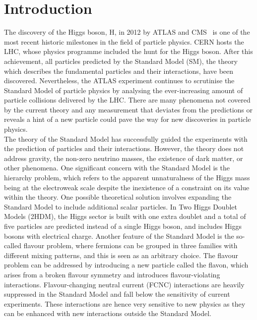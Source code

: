 \setchapterpreamble[u]{\margintoc}
\chapter*{Introduction}

The discovery of the Higgs boson, H, in 2012 by ATLAS and CMS~\cite{ATLASHiggs2012,CMShiggs2012} is one of the most recent historic milestones in the field of particle physics. CERN hosts the LHC, whose physics programme included the hunt for the Higgs boson. After this achievement, all particles predicted by the Standard Model (SM), the theory which describes the fundamental particles and their interactions, have been discovered. Nevertheless, the ATLAS experiment continues to scrutinise the Standard Model of particle physics by analysing the ever-increasing amount of particle collisions delivered by the LHC. There are many phenomena not covered by the current theory and any measurement that deviates from the predictions or reveals a hint of a new particle could pave the way for new discoveries in particle physics.\\

The theory of the Standard Model has successfully guided the experiments with the prediction of particles and their interactions. However, the theory does not address gravity, the non-zero neutrino masses, the existence of dark matter, or other phenomena. One significant concern with the Standard Model is the hierarchy problem, which refers to the apparent unnaturalness of the Higgs mass being at the electroweak scale despite the inexistence of a constraint on its value within the theory. One possible theoretical solution involves expanding the Standard Model to include additional scalar particles. In Two Higgs Doublet Models (2HDM), the Higgs sector is built with one extra doublet and a total of five particles are predicted instead of a single Higgs boson, and includes Higgs bosons with electrical charge.
Another feature of the Standard Model is the so-called flavour problem, where fermions can be grouped in three families with different mixing patterns, and this is seen as an arbitrary choice. The flavour problem can be addressed by introducing a new particle called the flavon, which arises from a broken flavour symmetry and introduces flavour-violating interactions. Flavour-changing neutral current (FCNC) interactions are heavily suppressed in the Standard Model and fall below the sensitivity of current experiments. These interactions are hence very sensitive to new physics as they can be enhanced with new interactions outside the Standard Model.\\

